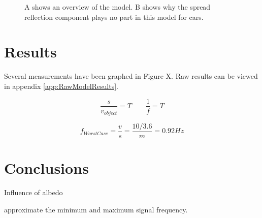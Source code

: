 \begin{figure}
	\centering     %
	\caption{A shows an overview of the model. B shows why the spread reflection component plays no part in this model for cars.}
\end{figure}

\section{Results}
Several measurements have been graphed in Figure X. Raw results can be viewed in appendix \ref{app:RawModelResults}. 



\begin{equation}
	\frac{s}{v_{object}} = T
	\qquad
	\frac{1}{f} = T
\end{equation}

\begin{equation}
f_{WorstCase} = \frac{v}{s} = \frac{10/3.6}{m} = 0.92 Hz
\end{equation}


\section{Conclusions}

Influence of albedo

approximate the minimum and maximum signal frequency.


